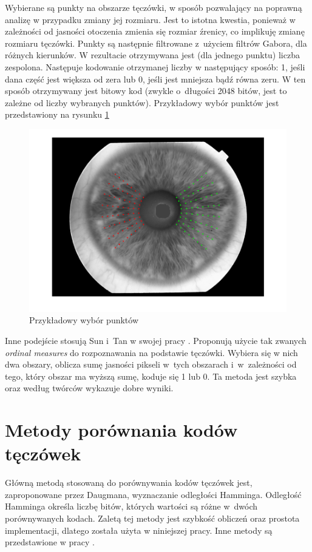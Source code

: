 Wybierane są punkty na obszarze tęczówki, w sposób pozwalający na poprawną analizę w przypadku zmiany jej rozmiaru. Jest to istotna kwestia, ponieważ w zależności od jasności otoczenia zmienia się rozmiar źrenicy, co implikuję zmianę rozmiaru tęczówki. Punkty są następnie filtrowane z~użyciem filtrów Gabora, dla różnych kierunków. W rezultacie otrzymywana jest (dla jednego punktu) liczba zespolona. Następuje kodowanie otrzymanej liczby w następujący sposób: 1, jeśli dana część jest większa od zera lub 0, jeśli jest mniejsza bądź równa zeru. W ten sposób otrzymywany jest bitowy kod (zwykle o~długości 2048 bitów, jest to zależne od liczby wybranych punktów). Przykładowy wybór punktów jest przedstawiony na rysunku \ref{fig:przykladPunkty}

\begin{figure}
\begin{center}
\includegraphics[scale=0.5]{punkty.png}
\caption{Przykładowy wybór punktów}
\label{fig:przykladPunkty}
\end{center}
\end{figure}

Inne podejście stosują Sun i~Tan w swojej pracy \cite{TaSu09}. Proponują użycie tak zwanych \emph{ordinal measures} do rozpoznawania na podstawie tęczówki. Wybiera się w nich dwa obszary, oblicza sumę jasności pikseli w~tych obszarach i~w~zależności od tego, który obszar ma wyższą sumę, koduje się 1 lub 0. Ta metoda jest szybka oraz według twórców wykazuje dobre wyniki.

\section{Metody porównania kodów tęczówek}
\label{sec:metodyPorownaniaKodow}
Główną metodą stosowaną do porównywania kodów tęczówek jest, zaproponowane przez Daugmana, wyznaczanie odległości Hamminga. Odległość Hamminga określa liczbę bitów, których wartości są różne w~dwóch porównywanych kodach. Zaletą tej metody jest szybkość obliczeń oraz prostota implementacji, dlatego została użyta w niniejszej pracy. Inne metody są przedstawione w pracy \cite{Gl11}.

